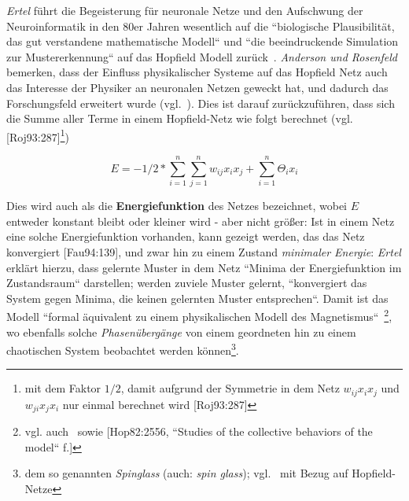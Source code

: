 \textit{Ertel} führt die Begeisterung für neuronale Netze und den Aufschwung der Neuroinformatik in den 80er Jahren wesentlich auf die ``biologische Plausibilität, das gut verstandene mathematische Modell`` und ``die beeindruckende Simulation zur Mustererkennung`` auf das Hopfield Modell zurück~\cite[297]{Ert21b}. \textit{Anderson und Rosenfeld} bemerken, dass der Einfluss physikalischer Systeme auf das Hopfield Netz auch das Interesse der Physiker an neuronalen Netzen geweckt hat, und dadurch das Forschungsfeld erweitert wurde (vgl.~\cite[458]{AR88}). Dies ist darauf zurückzuführen, dass sich die Summe aller Terme in einem Hopfield-Netz wie folgt berechnet (vgl. [Roj93:287]\footnote{
    mit dem Faktor $1/2$, damit aufgrund der Symmetrie in dem Netz $w_{ij}x_ix_j$ und $w_{ji}x_jx_i$ nur einmal berechnet wird [Roj93:287]
})

\begin{equation}
E = -1/2 * \sum^n_{i=1}\sum^n_{j=1} w_{ij}x_ix_j + \sum^n_{i=1}\Theta_ix_i
\label{eq:gl-energie}
\end{equation}

Dies wird auch als die \textbf{Energiefunktion} des Netzes bezeichnet, wobei $E$ entweder konstant bleibt oder kleiner wird - aber nicht größer: Ist in einem Netz eine solche Energiefunktion vorhanden, kann gezeigt werden, das das Netz konvergiert [Fau94:139], und zwar hin zu einem Zustand \textit{minimaler Energie}: \textit{Ertel} erklärt hierzu, dass gelernte Muster in dem Netz ``Minima der Energiefunktion im Zustandsraum`` darstellen; werden zuviele Muster gelernt, ``konvergiert das System gegen Minima, die keinen gelernten Muster entsprechen``.
Damit ist das Modell ``formal äquivalent zu einem physikalischen Modell des Magnetismus``~\cite[293]{Ert21b}\footnote{
    vgl. auch~\cite[417]{AR98} sowie [Hop82:2556, ``Studies of the collective behaviors of the model`` f.]
}, wo ebenfalls solche \textit{Phasenübergänge} von einem geordneten hin zu einem chaotischen System beobachtet werden können\footnote{
    dem so genannten \textit{Spinglass} (auch: \textit{spin glass}); vgl.~\cite[900]{BY86} mit Bezug auf Hopfield-Netze
}.\\


